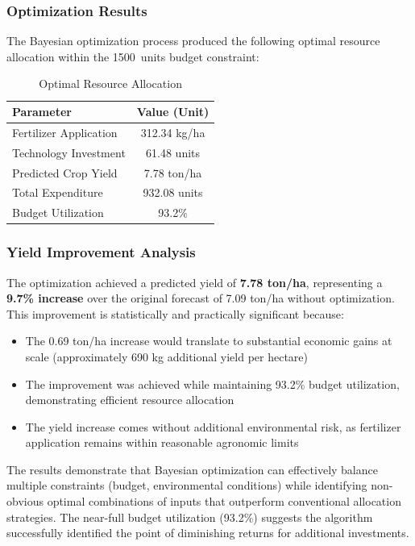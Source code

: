 \subsubsection{Optimization Results}
The Bayesian optimization process produced the following optimal resource allocation within the \SI{1500}{units} budget constraint:

\begin{table}[H]
\centering
\caption{Optimal Resource Allocation}
\label{tab:results}
\begin{tabular}{@{}lc@{}}
\toprule
\textbf{Parameter} & \textbf{Value (Unit)} \\
\midrule
Fertilizer Application & 312.34 \si{kg/ha} \\
Technology Investment & 61.48 units \\
Predicted Crop Yield & 7.78 \si{ton/ha} \\
Total Expenditure & 932.08 units \\
Budget Utilization & 93.2\% \\
\bottomrule
\end{tabular}
\end{table}

\subsubsection{Yield Improvement Analysis}
The optimization achieved a predicted yield of \textbf{7.78 ton/ha}, representing a \textbf{9.7\% increase} over the original forecast of 7.09 ton/ha without optimization. This improvement is statistically and practically significant because:

\begin{itemize}
\item The 0.69 ton/ha increase would translate to substantial economic gains at scale (approximately 690 kg additional yield per hectare)
\item The improvement was achieved while maintaining 93.2\% budget utilization, demonstrating efficient resource allocation
\item The yield increase comes without additional environmental risk, as fertilizer application remains within reasonable agronomic limits
\end{itemize}

The results demonstrate that Bayesian optimization can effectively balance multiple constraints (budget, environmental conditions) while identifying non-obvious optimal combinations of inputs that outperform conventional allocation strategies. The near-full budget utilization (93.2\%) suggests the algorithm successfully identified the point of diminishing returns for additional investments.

